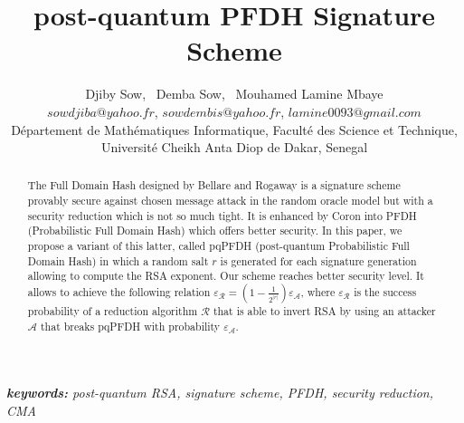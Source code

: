 \documentclass[a4paper,11pt]{article}
\author{Djiby Sow, \ Demba Sow, \ Mouhamed Lamine Mbaye\\
\small{$sowdjiba@yahoo.fr$,  $sowdembis@yahoo.fr$,  $lamine0093@gmail.com$}\\D\'epartement de Math\'ematiques Informatique,
Facult\'e des Science et Technique, Universit\'e  Cheikh Anta Diop de Dakar, Senegal}
\begin{document}
\title{post-quantum PFDH Signature Scheme}
\maketitle
\begin{abstract}
The Full Domain Hash designed by Bellare and Rogaway is a signature scheme provably secure against chosen message attack in the random oracle model but with a security reduction which is not so much tight. It is enhanced by Coron into PFDH (Probabilistic Full Domain Hash) which offers better security. In this paper, we propose a variant of this latter, called pqPFDH (post-quantum Probabilistic Full Domain Hash) in which a random salt $r$ is generated for each signature generation  allowing to compute the RSA exponent. Our scheme reaches  better security level. It allows to achieve the following relation $\varepsilon_\mathcal{R}=(1-\frac{1}{2^{|r|}})\varepsilon_\mathcal{A}$, where $\varepsilon_{\mathcal{R}}$  is the success probability of a reduction algorithm $\mathcal{R}$ that is able to invert RSA by using an attacker $\mathcal{A}$ that breaks pqPFDH with probability $\varepsilon_{\mathcal{A}}$.
\end{abstract}
{\it \textbf{keywords:} post-quantum RSA, signature scheme, PFDH, security reduction, CMA}
\end{document}
